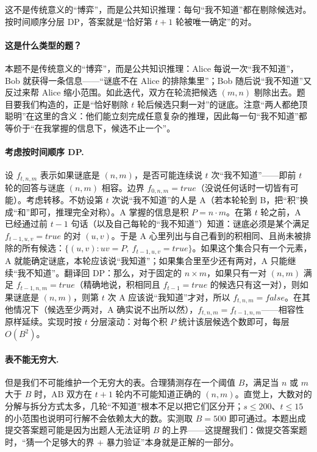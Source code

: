 \hint 这不是传统意义的“博弈”，而是公共知识推理：每句“我不知道”都在剔除候选对。按时间顺序分层 DP，答案就是“恰好第 $t+1$ 轮被唯一确定”的对。

\sol \paragraph{这是什么类型的题？} 本题不是传统意义的“博弈”，而是公共知识推理：Alice 每说一次“我不知道”，Bob 就获得一条信息——“谜底不在 Alice 的排除集里”；Bob 随后说“我不知道”又反过来帮 Alice 缩小范围。如此迭代，双方在轮流把候选 $(m,n)$ 剔除出去。题目要我们构造的，正是“恰好剔除 $t$ 轮后候选只剩一对”的谜底。注意“两人都绝顶聪明”在这里的含义：他们能立刻完成任意复杂的推理，因此每一句“我不知道”都等价于“在我掌握的信息下，候选不止一个”。

\paragraph{考虑按时间顺序 DP.} 设 $f_{t,n,m}$ 表示如果谜底是 $(n,m)$，是否可能连续说 $t$ 次“我不知道”——即前 $t$ 轮的回答与谜底 $(n,m)$ 相容。边界 $f_{0,n,m}=true$（没说任何话时一切皆有可能）。考虑转移。不妨设第 $t$ 次说“我不知道”的人是 A（若本轮轮到 B，把“积”换成“和”即可，推理完全对称）。A 掌握的信息是积 $P=n\cdot m$。在第 $t$ 轮之前，A 已经通过前 $t-1$ 句话（以及自己每轮的“我不知道”）知道：谜底必须是某个满足 $f_{t-1,u,v}=true$ 的对 $(u,v)$。于是 A 心里列出与自己看到的积相同、且尚未被排除的所有候选：$\{(u,v):uv=P,\ f_{t-1,u,v}=true\}$。如果这个集合只有一个元素，A 就能确定谜底，本轮应该说“我知道”；如果集合里至少还有两对，A 只能继续“我不知道”。翻译回 DP：那么，对于固定的 $n\times m$，如果只有一对 $(n,m)$ 满足 $f_{t-1,n,m}=true$（精确地说，积相同且 $f_{t-1}=true$ 的候选只有这一对），则如果谜底是 $(n,m)$，则第 $t$ 次 A 应该说“我知道”才对，所以 $f_{t,n,m}=false$。在其他情况下（候选至少两对，A 确实说不出所以然），$f_{t,n,m}=f_{t-1,n,m}$——相容性原样延续。实现时按 $t$ 分层滚动：对每个积 $P$ 统计该层候选个数即可，每层 $O(B^2)$。

\paragraph{表不能无穷大.} 但是我们不可能维护一个无穷大的表。合理猜测存在一个阈值 $B$，满足当 $n$ 或 $m$ 大于 $B$ 时，AB 双方在 $t+1$ 轮内不可能知道正确的 $(n,m)$。直觉上，大数对的分解与拆分方式太多，几轮“不知道”根本不足以把它们区分开；$s\le200$、$t\le15$ 的小范围也说明可行解不会依赖太大的数。实测取 $B=500$ 即可通过。本题出成提交答案题可能是因为出题人无法证明 $B$ 的上界——这提醒我们：做提交答案题时，“猜一个足够大的界 + 暴力验证”本身就是正解的一部分。

